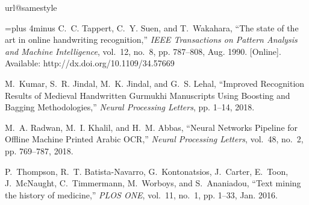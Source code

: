 \documentclass{article}
\begin{document}
\pagestyle{plain} 
































\begin{thebibliography}{100}
\providecommand{\url}[1]{#1}
\csname url@samestyle\endcsname
\providecommand{\newblock}{\relax}
\providecommand{\bibinfo}[2]{#2}
\providecommand{\BIBentrySTDinterwordspacing}{\spaceskip=0pt\relax}
\providecommand{\BIBentryALTinterwordstretchfactor}{4}
\providecommand{\BIBentryALTinterwordspacing}{\spaceskip=\fontdimen2\font plus
\BIBentryALTinterwordstretchfactor\fontdimen3\font minus
  \fontdimen4\font\relax}
\providecommand{\BIBforeignlanguage}[2]{{\expandafter\ifx\csname l@#1\endcsname\relax
\typeout{** WARNING: IEEEtran.bst: No hyphenation pattern has been}\typeout{** loaded for the language `#1'. Using the pattern for}\typeout{** the default language instead.}\else
\language=\csname l@#1\endcsname
\fi
#2}}
\providecommand{\BIBdecl}{\relax}
\BIBdecl

\BIBentryALTinterwordspacing
C.~C. Tappert, C.~Y. Suen, and T.~Wakahara, ``The state of the art in online
  handwriting recognition,'' \emph{IEEE Transactions on Pattern Analysis and
  Machine Intelligence}, vol.~12, no.~8, pp. 787--808, Aug. 1990. [Online].
  Available: \url{http://dx.doi.org/10.1109/34.57669}
\BIBentrySTDinterwordspacing

M.~Kumar, S.~R. Jindal, M.~K. Jindal, and G.~S. Lehal, ``{Improved Recognition
  Results of Medieval Handwritten Gurmukhi Manuscripts Using Boosting and
  Bagging Methodologies},'' \emph{Neural Processing Letters}, pp. 1--14, 2018.

M.~A. Radwan, M.~I. Khalil, and H.~M. Abbas, ``{Neural Networks Pipeline for
  Offline Machine Printed Arabic OCR},'' \emph{Neural Processing Letters},
  vol.~48, no.~2, pp. 769--787, 2018.

P.~Thompson, R.~T. Batista-Navarro, G.~Kontonatsios, J.~Carter, E.~Toon,
  J.~McNaught, C.~Timmermann, M.~Worboys, and S.~Ananiadou, ``Text mining the
  history of medicine,'' \emph{PLOS ONE}, vol.~11, no.~1, pp. 1--33, Jan. 2016.


\end{thebibliography}
\end{document}
